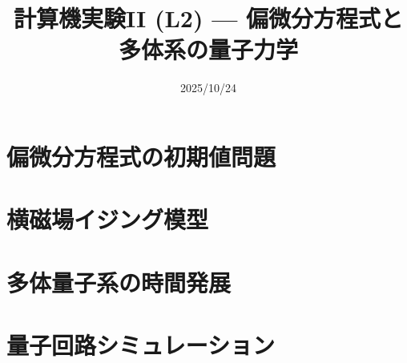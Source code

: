 \documentclass[10pt,dvipdfmx]{beamer}
\title{計算機実験II (L2) --- 偏微分方程式と多体系の量子力学}
\date{2025/10/24}
\begin{document}
\begin{frame}
  \titlepage
  \tableofcontents
\end{frame}

\section{偏微分方程式の初期値問題}
















% 
% 
% 

\section{横磁場イジング模型}





\section{多体量子系の時間発展}





\section{量子回路シミュレーション}







\section{}

\end{document}
